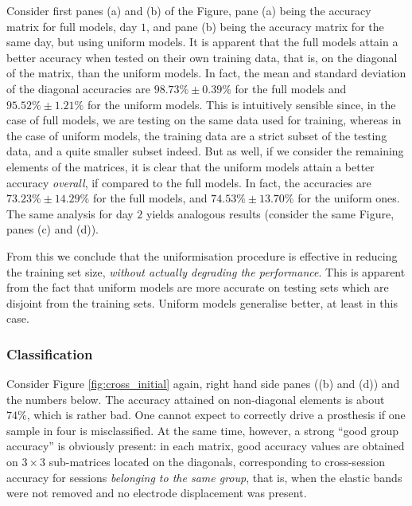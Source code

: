 Consider first panes (a) and (b) of the Figure, pane (a) being
the accuracy matrix for full models, day $1$, and pane (b) being the
accuracy matrix for the same day, but using uniform models. It is
apparent that the full models attain a better accuracy when tested on
their own training data, that is, on the diagonal of the matrix, than
the uniform models. In fact, the mean and standard deviation of the
diagonal accuracies are $98.73\% \pm 0.39\%$ for the full models and
$95.52\% \pm 1.21\%$ for the uniform models. This is intuitively
sensible since, in the case of full models, we are testing on the same
data used for training, whereas in the case of uniform models, the
training data are a strict subset of the testing data, and a quite
smaller subset indeed. But as well, if we consider the remaining
elements of the matrices, it is clear that the uniform models attain a
better accuracy \emph{overall}, if compared to the full models. In
fact, the accuracies are $73.23\% \pm 14.29\%$ for the full models,
and $74.53\% \pm 13.70\%$ for the uniform ones. The same analysis for
day $2$ yields analogous results (consider the same Figure, panes
(c) and (d)).

From this we conclude that the uniformisation procedure is effective
in reducing the training set size, \emph{without actually degrading
the performance}. This is apparent from the fact that uniform models
are more accurate on testing sets which are disjoint from the training
sets. Uniform models generalise better, at least in this case.

\subsubsection{Classification}

Consider Figure \ref{fig:cross_initial} again, right hand side panes
((b) and (d)) and the numbers below. The accuracy attained on
non-diagonal elements is about $74\%$, which is rather bad. One cannot
expect to correctly drive a prosthesis if one sample in four is
misclassified. At the same time, however, a strong ``good group
accuracy'' is obviously present: in each matrix, good accuracy values
are obtained on $3\times3$ sub-matrices located on the diagonals,
corresponding to cross-session accuracy for sessions \emph{belonging
to the same group}, that is, when the elastic bands were not removed
and no electrode displacement was present.


